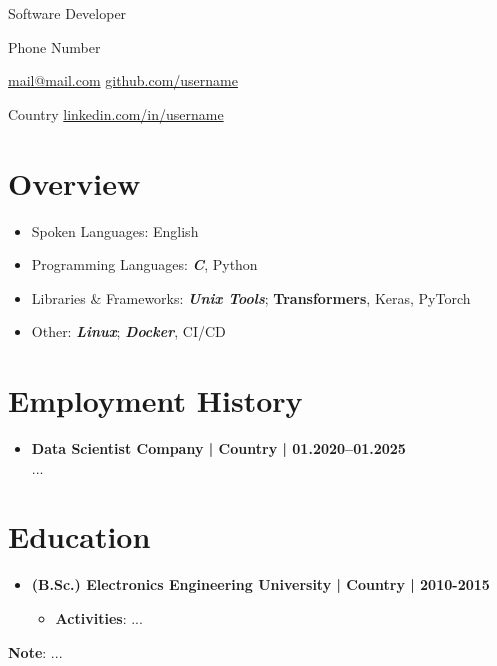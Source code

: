 \documentclass[a4paper,11pt]{article}
\begin{document}

\vspace{2pt}

\noindent Software Developer

\vspace{4pt}

\noindent Phone Number

\noindent \href{mailto:mail@mail.com}{mail@mail.com} \hfill \href{https://github.com/username}{github.com/username}

\noindent Country \hfill \href{https://linkedin.com/in/username}{linkedin.com/in/username}

\vspace{8pt}

\section*{Overview}

\begin{itemize}[leftmargin=*]
    \setlength\itemsep{-0.8pt}
    \item Spoken Languages: English
    \item Programming Languages: \textbf{\textit{C}}, Python
    \item Libraries \& Frameworks: \textbf{\textit{Unix Tools}}; \textbf{Transformers}, Keras, PyTorch
    \item[\textbullet] Other: \textbf{\textit{Linux}}; \textbf{\textit{Docker}}, CI/CD
\end{itemize}

\vspace{-12pt}

\section*{Employment History}

\begin{itemize}[leftmargin=*]
    \item \small \textbf{Data Scientist \hfill Company | Country | 01.2020–01.2025}\\
    \hspace*{0.8em} ...
\end{itemize}

\vspace{-12pt}

\section*{Education}

\begin{itemize}[leftmargin=*]
    \item \small \textbf{(B.Sc.) Electronics Engineering \hfill University | Country | 2010-2015}\\
        \vspace{-16pt}
        \begin{itemize}
            \setlength\itemsep{-2pt}
            \item[\textbullet] \textbf{Activities}: ...
        \end{itemize}
\end{itemize}

\vfill
\noindent \textbf{Note}: ...
\end{document}
